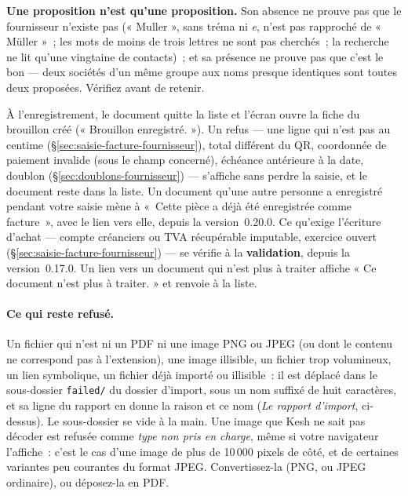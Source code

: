 \documentclass[a4paper,11pt,oneside]{article}
\begin{document}
\begin{keshwarning}
\textbf{Une proposition n'est qu'une proposition.} Son absence ne prouve pas que le
fournisseur n'existe pas (« Muller », sans tréma ni \emph{e}, n'est pas rapproché de
« Müller »~; les mots de moins de trois lettres ne sont pas cherchés~; la recherche ne lit
qu'une vingtaine de contacts)~; et sa présence ne prouve pas que c'est le bon --- deux
sociétés d'un même groupe aux noms presque identiques sont toutes deux proposées.
Vérifiez avant de retenir.
\end{keshwarning}

À l'enregistrement, le document quitte la liste et l'écran ouvre la fiche du brouillon
créé (« Brouillon enregistré. »). Un refus --- une ligne qui n'est pas au centime
(\S\ref{sec:saisie-facture-fournisseur}), total différent du QR, coordonnée de paiement
invalide (sous le champ concerné), échéance antérieure à la date, doublon
(\S\ref{sec:doublons-fournisseur}) --- s'affiche sans perdre la saisie, et le document reste
dans la liste. Un document qu'une autre personne a enregistré pendant votre saisie mène à
«~Cette pièce a déjà été enregistrée comme facture~», avec le lien vers elle, depuis la
version~0.20.0. Ce qu'exige l'écriture d'achat --- compte créanciers ou TVA récupérable imputable,
exercice ouvert (\S\ref{sec:saisie-facture-fournisseur}) --- se vérifie à la
\textbf{validation}, depuis la version~0.17.0. Un lien vers un document qui n'est plus à traiter affiche « Ce document n'est plus à
traiter. » et renvoie à la liste.

\paragraph{Ce qui reste refusé.} Un fichier qui n'est ni un PDF ni une image PNG ou JPEG
(ou dont le contenu ne correspond pas à l'extension), une image illisible, un fichier trop
volumineux, un lien symbolique, un fichier déjà importé ou illisible~: il est déplacé dans
le sous-dossier \texttt{failed/} du dossier d'import, sous un nom suffixé de huit
caractères, et sa ligne du rapport en donne la raison et ce nom (\emph{Le rapport
d'import}, ci-dessus). Le sous-dossier se vide à la main.
Une image que Kesh ne sait pas décoder est refusée comme \emph{type non pris en charge},
même si votre navigateur l'affiche~: c'est le cas d'une image de plus de 10\,000 pixels
de côté, et de certaines variantes peu courantes du format JPEG. Convertissez-la (PNG,
ou JPEG ordinaire), ou déposez-la en PDF.
\end{document}
